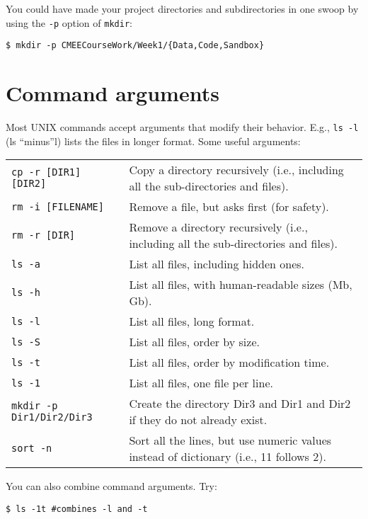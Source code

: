 You could have made your project directories and subdirectories in one 
swoop by using the {\tt -p} option of {\tt mkdir}: 

\begin{lstlisting}
$ mkdir -p CMEECourseWork/Week1/{Data,Code,Sandbox}
\end{lstlisting}

 
\section{Command arguments}

Most UNIX commands accept arguments that modify their behavior. E.g.,  {\tt ls 
-l} (ls ``minus''l) lists the files in longer format. Some useful 
arguments:
 
\begin{tabular}{p{} p{}} 

{\tt cp -r [DIR1] [DIR2]} & Copy a directory recursively (i.e., including 
all the sub-directories and files).\\
{\tt rm -i [FILENAME]} & Remove a file, but asks first (for safety).\\
{\tt rm -r [DIR]} & Remove a directory recursively (i.e., including all the 
sub-directories and files).\\
{\tt ls -a} & List all files, including hidden ones.\\
{\tt ls -h} & List all files, with human-readable sizes (Mb, Gb).\\
{\tt ls -l} & List all files, long format.\\
{\tt ls -S} & List all files, order by size.\\
{\tt ls -t} & List all files, order by modification time.\\
{\tt ls -1} & List all files, one file per line.\\
{\tt mkdir -p Dir1/Dir2/Dir3} & Create the directory Dir3 and Dir1 and 
Dir2 if they do not already exist.\\
{\tt sort -n} & Sort all the lines, but use numeric values
  instead of dictionary (i.e., 11 follows 2).\\
\end{tabular}

You can also combine command arguments. Try:
\begin{lstlisting}
$ ls -1t #combines -l and -t
\end{lstlisting}

